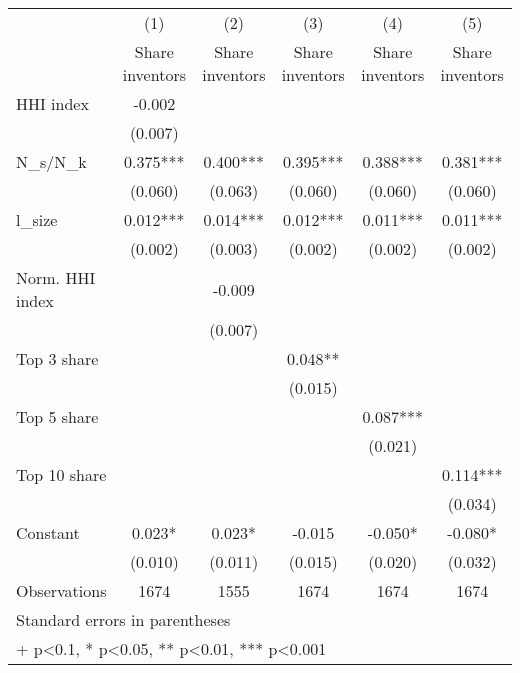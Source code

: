 {
\def\sym#1{\ifmmode^{#1}\else\(^{#1}\)\fi}
\begin{tabular}{l*{5}{c}}
\hline\hline
                    &\multicolumn{1}{c}{(1)}&\multicolumn{1}{c}{(2)}&\multicolumn{1}{c}{(3)}&\multicolumn{1}{c}{(4)}&\multicolumn{1}{c}{(5)}\\
                    &\multicolumn{1}{c}{Share inventors}&\multicolumn{1}{c}{Share inventors}&\multicolumn{1}{c}{Share inventors}&\multicolumn{1}{c}{Share inventors}&\multicolumn{1}{c}{Share inventors}\\
\hline
HHI index           &      -0.002   &               &               &               &               \\
                    &     (0.007)   &               &               &               &               \\
[1em]
N\_s/N\_k             &       0.375***&       0.400***&       0.395***&       0.388***&       0.381***\\
                    &     (0.060)   &     (0.063)   &     (0.060)   &     (0.060)   &     (0.060)   \\
[1em]
l\_size              &       0.012***&       0.014***&       0.012***&       0.011***&       0.011***\\
                    &     (0.002)   &     (0.003)   &     (0.002)   &     (0.002)   &     (0.002)   \\
[1em]
Norm. HHI index     &               &      -0.009   &               &               &               \\
                    &               &     (0.007)   &               &               &               \\
[1em]
Top 3 share         &               &               &       0.048** &               &               \\
                    &               &               &     (0.015)   &               &               \\
[1em]
Top 5 share         &               &               &               &       0.087***&               \\
                    &               &               &               &     (0.021)   &               \\
[1em]
Top 10 share        &               &               &               &               &       0.114***\\
                    &               &               &               &               &     (0.034)   \\
[1em]
Constant            &       0.023*  &       0.023*  &      -0.015   &      -0.050*  &      -0.080*  \\
                    &     (0.010)   &     (0.011)   &     (0.015)   &     (0.020)   &     (0.032)   \\
\hline
Observations        &        1674   &        1555   &        1674   &        1674   &        1674   \\
\hline\hline
\multicolumn{6}{l}{\footnotesize Standard errors in parentheses}\\
\multicolumn{6}{l}{\footnotesize + p<0.1, * p<0.05, ** p<0.01, *** p<0.001}\\
\end{tabular}
}

